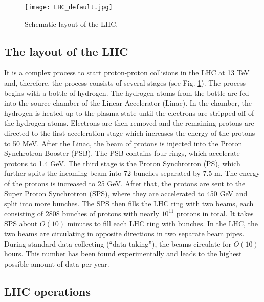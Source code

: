 \begin{normalsize}
\begin{figure}[H]
  \centering
  \texttt{[image: LHC\_default.jpg]}
  \caption {Schematic layout of the LHC.}
  \label{lhcmap}
\end{figure}



\subsection{The layout of the LHC}

It is a complex process to start proton-proton collisions in the LHC at 13 TeV and, therefore, the process consists of several stages (see Fig. \ref{lhcmap}). The process begins with a bottle of hydrogen. The hydrogen atoms from the bottle are fed into the source chamber of the Linear Accelerator (Linac). In the chamber, the hydrogen is heated up to the plasma state until the electrons are stripped off of the hydrogen atoms. Electrons are then removed and the remaining protons are directed to the first acceleration stage which increases the energy of the protons to 50 MeV. After the Linac, the beam of protons is injected into the Proton Synchrotron Booster (PSB). The PSB contains four rings, which accelerate protons to 1.4 GeV. The third stage is the Proton Synchrotron (PS), which further splits the incoming beam into 72 bunches separated by 7.5 m. The energy of the protons is increased to 25 GeV. After that, the protons are sent to the Super Proton Synchrotron (SPS), where they are accelerated to 450 GeV and split into more bunches. The SPS then fills the LHC ring with two beams, each consisting of 2808 bunches of protons with nearly $10^{11}$ protons in total. It takes SPS about $O(10)$ minutes to fill each LHC ring with bunches. In the LHC, the two beams are circulating in opposite directions in two separate beam pipes. During standard data collecting (``data taking''), the beams circulate for $O(10)$ hours. This number has been found experimentally and leads to the highest possible amount of data per year.  

\subsection{LHC operations}


\end{normalsize}
